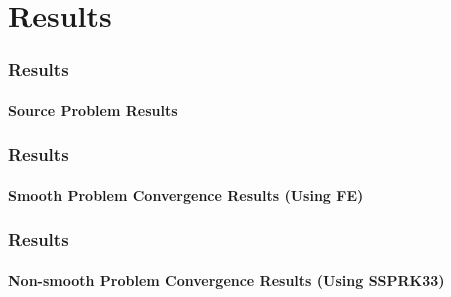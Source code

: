 \documentclass{beamer}
\begin{document}
\section{Results}
\begin{frame}
\frametitle{Results}
\framesubtitle{Source Problem Results}


\end{frame}
\begin{frame}
\frametitle{Results}
\framesubtitle{Smooth Problem Convergence Results (Using FE)}


\end{frame}
\begin{frame}
\frametitle{Results}
\framesubtitle{Non-smooth Problem Convergence Results (Using SSPRK33)}


\end{frame}
\end{document}
